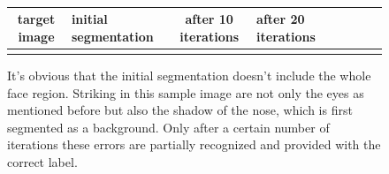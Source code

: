\\
\begin{figure}[h]
	\begin{center}
		\begin{tabular}{SC|SC|SC|SC}
			 target image & initial segmentation & after 10 iterations & after 20 iterations\\ \hline
			 &
			 &
			 &
			 \\
		\end{tabular}
	\end{center}
	\caption{It's obvious that the initial segmentation doesn't include the whole face region. Striking in this sample image are not only the eyes as mentioned before but also the shadow of the nose, which is first segmented as a background. Only after a certain number of iterations these errors are partially recognized and provided with the correct label.}
	\label{fig:iterations}
\end{figure}


